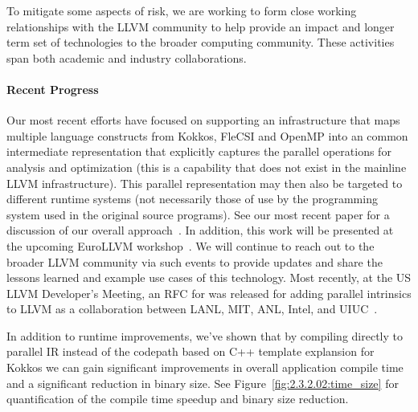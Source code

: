 To mitigate some aspects of risk, we are working to form close working
relationships with the LLVM community to help provide an impact and
longer term set of technologies to the broader computing community.
These activities span both academic and industry collaborations.

\paragraph{Recent Progress}
Our most recent efforts have focused on supporting an infrastructure
that maps multiple language constructs from Kokkos, FleCSI and OpenMP
into an common intermediate representation that explicitly captures
the parallel operations for analysis and optimization (this is a
capability that does not exist in the mainline LLVM infrastructure).
This parallel representation may then also be targeted to different
runtime systems (not necessarily those of use by the programming
system used in the original source programs).  See our most recent
paper for a discussion of our overall approach~\cite{Stelle:2017}.  In
addition, this work will be presented at the upcoming EuroLLVM
workshop~\cite{EuroLLVM:2018}.  We will continue to reach out to the
broader LLVM community via such events to provide updates and share the
lessons learned and example use cases of this technology.  Most recently,
at the US LLVM Developer's Meeting, an RFC for was released for
adding parallel intrinsics to LLVM as a collaboration between LANL,
MIT, ANL, Intel, and UIUC~\cite{LLVMPAR:rfc}.

In addition to runtime improvements, we've shown that by compiling
directly to parallel IR instead of the codepath based on C++
template explansion for Kokkos we can gain significant improvements in
overall application compile time and a significant reduction in binary
size. See Figure~\ref{fig:2.3.2.02:time_size} for quantification of the compile
time speedup and binary size reduction.

